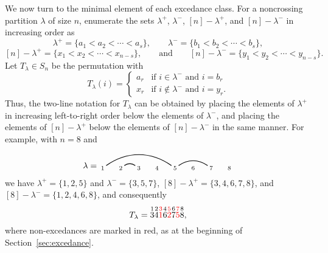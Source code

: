 \documentclass[submission]{FPSAC2024}
\theoremstyle{definition}
\theoremstyle{remark}
\numberwithin{equation}{section}
\renewcommand{\setminus}{-}
\begin{document}
We now turn to the minimal element of each excedance class.  For a noncrossing partition $\lambda$ of size $n$, enumerate the sets $\lambda^{+}$, $\lambda^{-}$, $[n] \setminus \lambda^{+}$, and  $[n] \setminus \lambda^{-}$ in increasing order as
\[
\lambda^{+} = \{a_{1} < a_{2} < \cdots < a_{s}\},
\qquad
\lambda^{-} = \{b_{1} < b_{2} < \cdots < b_{s}\},
\]
\[
[n] \setminus \lambda^{+} = \{x_{1} < x_{2} < \cdots < x_{n-s}\},
\qquad\text{and}\qquad
[n] \setminus \lambda^{-} = \{y_{1} < y_{2} < \cdots < y_{n-s}\}.
\]
Let $T_{\lambda} \in S_{n}$ be the permutation with
\[
T_{\lambda}(i) = \begin{cases} a_{r} & \text{if $i \in \lambda^{-}$ and $i = b_{r}$} \\ x_{r} & \text{if $i \notin \lambda^{-}$ and $i = y_{r}$.}  \end{cases}
\]
Thus, the two-line notation for $T_{\lambda}$ can be obtained by placing the elements of $\lambda^{+}$ in increasing left-to-right order below the elements of $\lambda^{-}$, and placing the elements of $[n] \setminus \lambda^{+}$ below the elements of $[n] \setminus \lambda^{-}$ in the same manner.  For example, with $n = 8$ and 
\[
\lambda = \begin{tikzpicture}[scale = 0.75, baseline = 0.75*-0.2]
\foreach \x in {1, ..., 8}{\draw[fill] (\x - 1, 0) node[inner sep = 2pt] (\x) {$\scriptstyle \x$};}
\foreach \i\j in {1/5, 2/3, 5/7}{\draw[thick] (\i) to[out = 35, in = 145] (\j);}
\end{tikzpicture}
\]
we have $\lambda^{+} = \{1, 2, 5\}$ and $\lambda^{-} = \{3, 5, 7\}$, $[8] \setminus \lambda^{+} = \{3, 4, 6, 7, 8\}$, and $[8] \setminus \lambda^{-} = \{1, 2, 4, 6, 8\}$, and consequently
\[
T_{\lambda} = \overset{1}{3} \overset{2}{4} {\color{red} \overset{3}{1}} \overset{4}{6} {\color{red} \overset{5}{2}} \overset{6}{7} {\color{red} \overset{7}{5}} \overset{8}{8},
\]
where non-excedances are marked in red, as at the beginning of Section~\ref{sec:excedance}.
\end{document}
